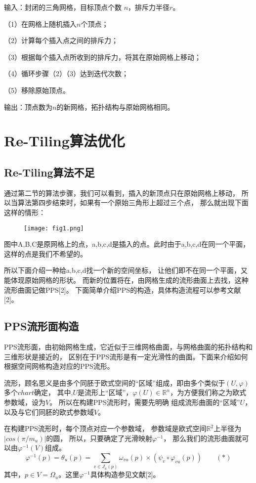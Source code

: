 \documentclass[lang=cn,11pt,a4paper,cite=authoryear]{elegantpaper}
\begin{document}
输入：封闭的三角网格，目标顶点个数 $n$，排斥力半径$r$。

（1）在网格上随机插入$n$个顶点；

（2）计算每个插入点之间的排斥力；

（3）根据每个插入点所收到的排斥力，将其在原始网格上移动；

（4）循环步骤（2）（3）达到迭代次数；

（5）移除原始顶点。

输出：顶点数为$n$的新网格，拓扑结构与原始网格相同。


\section{Re-Tiling算法优化}
\subsection{Re-Tiling算法不足}
通过第二节的算法步骤，我们可以看到，插入的新顶点只在原始网格上移动，
所以当算法第四步结束时，如果有一个原始三角形上超过三个点，
那么就出现下面这样的情形：

\begin{figure}[!htb]
\centering
\texttt{[image: fig1.png]}
\caption{}
\end{figure}

图中A,B,C是原网格上的点，a,b,c,d是插入的点。此时由于a,b,c,d在同一个平面，
这样的点是我们不希望的。

所以下面介绍一种给a,b,c,d找一个新的空间坐标，
让他们即不在同一个平面，又能体现原始网格的形状。
而新的位置将在，由网格生成的流形曲面上去找，这种流形曲面记做PPS[2]。
下面简单介绍PPS的构造，具体构造流程可以参考文献[2]。

\subsection{PPS流形面构造}

PPS流形面，由初始网格生成，它近似于三维网格曲面，与网格曲面的拓扑结构和三维形状是接近的，
区别在于PPS流形是有一定光滑性的曲面。下面来介绍如何根据空间网格构造对应的PPS流形。

流形，顾名思义是由多个同胚于欧式空间的“区域”组成，即由多个类似于$(U,\varphi)$多个$chart$确定，
其中,$U$是流形上“区域”，$\varphi(U)\in \mathbb{R}^n$，为方便我们称之为欧式参数域，设为$V$。
所以在构建PPS流形时，需要先明确
组成流形曲面的“区域”$U$，以及与它们同胚的欧式参数域$V$。

在构建PPS流形时，每个顶点对应一个参数域，
参数域是欧式空间$\mathbb{R}^2$上半径为$|cos(\pi/m_u)|$的圆，
所以，只要确定了光滑映射$\varphi^{-1}$，
那么我们的流形曲面就可以由${\varphi^{-1}(V)}$组成。
$$\varphi^{-1}(p) = \theta_{u}(p)=\sum_{v \in J_{u}(p)} \omega_{v u}(p) 
\times\left(\psi_{v} \circ \varphi_{v u}(p)\right) \quad \quad (*)$$
其中，$p \in V = \Omega_{u}$。这里$\varphi^{-1}$具体构造参见文献[2]。
\end{document}
